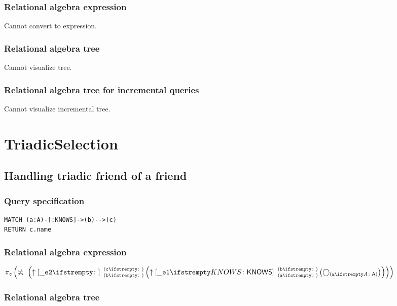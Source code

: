 \subsubsection*{Relational algebra expression}

Cannot convert to expression.

\subsubsection*{Relational algebra tree}

Cannot visualize tree.

\subsubsection*{Relational algebra tree for incremental queries}

Cannot visualize incremental tree.

\section{TriadicSelection}

\subsection{Handling triadic friend of a friend}

\subsubsection*{Query specification}

\begin{lstlisting}
MATCH (a:A)-[:KNOWS]->(b)-->(c)
RETURN c.name
\end{lstlisting}

\subsubsection*{Relational algebra expression}

$\projection{\var{c}} \left(\alldifferent{} \left(\expandout{\_e2}{}{b}{c}{} \left(\expandout{\_e1}{KNOWS}{a}{b}{} \left(\getvertices{a}{A}\right)\right)\right)\right)$

\subsubsection*{Relational algebra tree}


